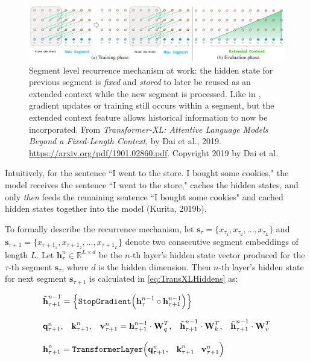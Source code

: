 \begin{figure}[h]
\centering
\includegraphics[width=\linewidth]{imgs/transXL_extendedcontext.png}
\caption{Segment level recurrence mechanism at work: the hidden state for previous segment is \emph{fixed} and \emph{stored} to later be reused as an extended context while the new segment is processed. Like in , gradient updates or training still occurs within a segment, but the extended context feature allows historical information to now be incorporated. From \emph{Transformer-XL: Attentive Language Models Beyond a Fixed-Length Context}, by Dai et al., 2019. \url{https://arxiv.org/pdf/1901.02860.pdf}. Copyright 2019 by Dai et al.}
\label{fig:transXL_extendedContext}
\end{figure}


Intuitively, for the sentence ``I went to the store. I bought some cookies," the model receives the sentence ``I went to the store," caches the hidden states, and only \emph{then} feeds the remaining sentence ``I bought some cookies" and cached hidden states together into the model (Kurita, 2019b). 

To formally describe the recurrence mechanism, let $\textbf{s}_\tau = \Big\{ x_{\tau_1}, x_{\tau_2}, ..., x_{\tau_L} \Big\}$ and $\textbf{s}_{\tau + 1} = \Big\{ x_{{\tau+1}_1}, x_{{\tau+1}_2}, ..., x_{{\tau+1}_L} \Big\}$ denote two consecutive segment embeddings of length $L$. Let $\textbf{h}_\tau^n \in \mathbb{R}^{L \times d}$ be the $n$-th layer's hidden state vector produced for the $\tau$-th segment $\textbf{s}_\tau$, where $d$ is the hidden dimension. Then $n$-th layer's hidden state for next segment $\textbf{s}_{\tau + 1}$ is calculated in \cref{eq:TransXLHiddens} as:


\begin{equation}
\begin{array}{ll}
\Tilde{\textbf{h}}_{\tau + 1}^{n-1} = \Big\{ \texttt{StopGradient}\Big( \textbf{h}_\tau^{n-1} \circ \textbf{h}_{\tau+1}^{n-1} \Big) \Big\} \\\\
%
\textbf{q}_{\tau+1}^n, \;\;\; \textbf{k}_{\tau+1}^n, \;\;\; \textbf{v}_{\tau+1}^n = \textbf{h}_{\tau+1}^{n-1} \cdot \textbf{W}_q^T, \;\;\; \Tilde{\textbf{h}}_{\tau+1}^{n-1} \cdot \textbf{W}_k^T, \;\;\; \Tilde{\textbf{h}}_{\tau+1}^{n-1} \cdot \textbf{W}_v^T \\\\
%
\textbf{h}_{\tau+1}^n = \texttt{TransformerLayer} \Big( \textbf{q}_{\tau+1}^n, \;\;\; \textbf{k}_{\tau+1}^n \;\;\; \textbf{v}_{\tau+1}^n \Big)
\end{array}
\label{eq:TransXLHiddens}
\end{equation}



